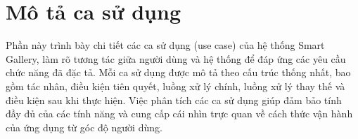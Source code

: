 \section{Mô tả ca sử dụng}

Phần này trình bày chi tiết các ca sử dụng (use case) của hệ thống Smart Gallery, làm rõ tương tác giữa người dùng và hệ thống để đáp ứng các yêu cầu chức năng đã đặc tả. Mỗi ca sử dụng được mô tả theo cấu trúc thống nhất, bao gồm tác nhân, điều kiện tiên quyết, luồng xử lý chính, luồng xử lý thay thế và điều kiện sau khi thực hiện. Việc phân tích các ca sử dụng giúp đảm bảo tính đầy đủ của các tính năng và cung cấp cái nhìn trực quan về cách thức vận hành của ứng dụng từ góc độ người dùng.


% 
% 

\nopagebreak

\nopagebreak
% 
% 

\nopagebreak

\nopagebreak

\nopagebreak

\nopagebreak
% 
% 
% 

\nopagebreak

\nopagebreak

\nopagebreak
% 
